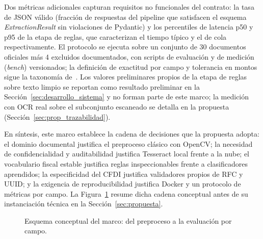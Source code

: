 Dos m\'etricas adicionales capturan requisitos no funcionales del contrato: la tasa de JSON v\'alido (fracci\'on de respuestas del pipeline que satisfacen el esquema \textit{ExtractionResult} sin violaciones de Pydantic) y los percentiles de latencia p50 y p95 de la etapa de reglas, que caracterizan el tiempo t\'ipico y el de cola respectivamente\cite{pydantic_v2_2024, sokolova_metrics_2009}. El protocolo se ejecuta sobre un conjunto de 30 documentos oficiales m\'as 4 excluidos documentados, con scripts de evaluaci\'on y de medici\'on (\textit{bench}) versionados; la definici\'on de exactitud por campo y tolerancia en montos sigue la taxonom\'ia de~\cite{sokolova_metrics_2009}. Los valores preliminares propios de la etapa de reglas sobre texto limpio se reportan como resultado preliminar en la Secci\'on~\ref{sec:desarrollo_sistema} y no forman parte de este marco; la medici\'on con OCR real sobre el subconjunto escaneado se detalla en la propuesta (Secci\'on~\ref{sec:prop_trazabilidad}).

En s\'intesis, este marco establece la cadena de decisiones que la propuesta adopta: el dominio documental justifica el preproceso cl\'asico con OpenCV; la necesidad de confidencialidad y auditabilidad justifica Tesseract local frente a la nube; el vocabulario fiscal estable justifica reglas inspeccionables frente a clasificadores aprendidos; la especificidad del CFDI justifica validadores propios de RFC y UUID; y la exigencia de reproducibilidad justifica Docker y un protocolo de m\'etricas por campo. La Figura~\ref{fig:flujo_marco} resume dicha cadena conceptual antes de su instanciaci\'on t\'ecnica en la Secci\'on~\ref{sec:propuesta}.

\begin{figure}[H]
\centering
{}
\caption{Esquema conceptual del marco: del preproceso a la evaluaci\'on por campo.}
\label{fig:flujo_marco}
\end{figure}

